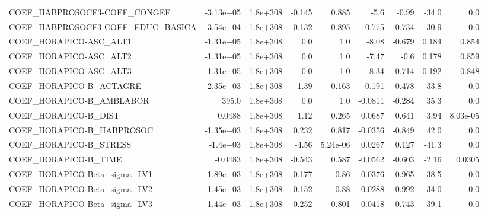 \begin{tabular}{lrrrrrrrr}
COEF\_HABPROSOCF3-COEF\_CONGEF      &   -3.13e+05 &     1.8e+308 &   -0.145 &    0.885 &       -5.6 &       -0.99 &        -34.0 &           0.0 \\
COEF\_HABPROSOCF3-COEF\_EDUC\_BASICA &    3.54e+04 &     1.8e+308 &   -0.132 &    0.895 &      0.775 &       0.734 &        -30.9 &           0.0 \\
COEF\_HORAPICO-ASC\_ALT1            &   -1.31e+05 &     1.8e+308 &      0.0 &      1.0 &      -8.08 &      -0.679 &        0.184 &         0.854 \\
COEF\_HORAPICO-ASC\_ALT2            &   -1.31e+05 &     1.8e+308 &      0.0 &      1.0 &      -7.47 &        -0.6 &        0.178 &         0.859 \\
COEF\_HORAPICO-ASC\_ALT3            &   -1.31e+05 &     1.8e+308 &      0.0 &      1.0 &      -8.34 &      -0.714 &        0.192 &         0.848 \\
COEF\_HORAPICO-B\_ACTAGRE           &    2.35e+03 &     1.8e+308 &    -1.39 &    0.163 &      0.191 &       0.478 &        -33.8 &           0.0 \\
COEF\_HORAPICO-B\_AMBLABOR          &       395.0 &     1.8e+308 &      0.0 &      1.0 &    -0.0811 &      -0.284 &         35.3 &           0.0 \\
COEF\_HORAPICO-B\_DIST              &      0.0488 &     1.8e+308 &     1.12 &    0.265 &     0.0687 &       0.641 &         3.94 &      8.03e-05 \\
COEF\_HORAPICO-B\_HABPROSOC         &   -1.35e+03 &     1.8e+308 &    0.232 &    0.817 &    -0.0356 &      -0.849 &         42.0 &           0.0 \\
COEF\_HORAPICO-B\_STRESS            &    -1.4e+03 &     1.8e+308 &    -4.56 & 5.24e-06 &     0.0267 &       0.127 &        -41.3 &           0.0 \\
COEF\_HORAPICO-B\_TIME              &     -0.0483 &     1.8e+308 &   -0.543 &    0.587 &    -0.0562 &      -0.603 &        -2.16 &        0.0305 \\
COEF\_HORAPICO-Beta\_sigma\_LV1      &   -1.89e+03 &     1.8e+308 &    0.177 &     0.86 &    -0.0376 &      -0.965 &         38.5 &           0.0 \\
COEF\_HORAPICO-Beta\_sigma\_LV2      &    1.45e+03 &     1.8e+308 &   -0.152 &     0.88 &     0.0288 &       0.992 &        -34.0 &           0.0 \\
COEF\_HORAPICO-Beta\_sigma\_LV3      &   -1.44e+03 &     1.8e+308 &    0.252 &    0.801 &    -0.0418 &      -0.743 &         39.1 &           0.0 \\

\end{tabular}

